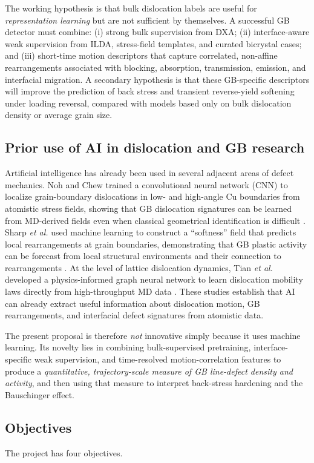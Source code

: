 The working hypothesis is that bulk dislocation labels are useful for \emph{representation learning} but are not sufficient by themselves. A successful GB detector must combine: (i) strong bulk supervision from DXA; (ii) interface-aware weak supervision from ILDA, stress-field templates, and curated bicrystal cases; and (iii) short-time motion descriptors that capture correlated, non-affine rearrangements associated with blocking, absorption, transmission, emission, and interfacial migration. A secondary hypothesis is that these GB-specific descriptors will improve the prediction of back stress and transient reverse-yield softening under loading reversal, compared with models based only on bulk dislocation density or average grain size.

\subsection*{Prior use of AI in dislocation and GB research}
Artificial intelligence has already been used in several adjacent areas of defect mechanics. Noh and Chew trained a convolutional neural network (CNN) to localize grain-boundary dislocations in low- and high-angle Cu boundaries from atomistic stress fields, showing that GB dislocation signatures can be learned from MD-derived fields even when classical geometrical identification is difficult \cite{Noh2024}. Sharp \emph{et al.} used machine learning to construct a ``softness'' field that predicts local rearrangements at grain boundaries, demonstrating that GB plastic activity can be forecast from local structural environments and their connection to rearrangements \cite{Sharp2018}. At the level of lattice dislocation dynamics, Tian \emph{et al.} developed a physics-informed graph neural network to learn dislocation mobility laws directly from high-throughput MD data \cite{Tian2024}. These studies establish that AI can already extract useful information about dislocation motion, GB rearrangements, and interfacial defect signatures from atomistic data.

The present proposal is therefore \emph{not} innovative simply because it uses machine learning. Its novelty lies in combining bulk-supervised pretraining, interface-specific weak supervision, and time-resolved motion-correlation features to produce a \emph{quantitative, trajectory-scale measure of GB line-defect density and activity}, and then using that measure to interpret back-stress hardening and the Bauschinger effect.

\subsection*{Objectives}
The project has four objectives.

